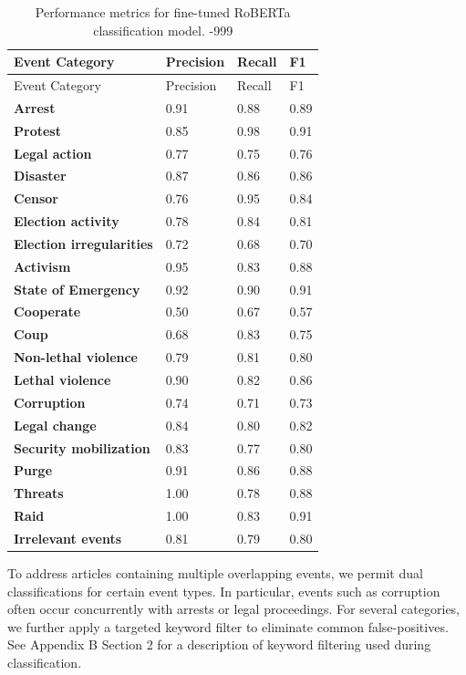 \documentclass[
  letterpaper,
  DIV=11,
  numbers=noendperiod]{scrartcl}
\begin{document}
\hypertarget{tbl-roberta}{}
\begin{longtable}[]{@{}llll@{}}
\caption{\label{tbl-roberta}Performance metrics for fine-tuned RoBERTa
classification model. -999}\tabularnewline
\toprule\noalign{}
Event Category & Precision & Recall & F1 \\
\midrule\noalign{}
\endfirsthead
\toprule\noalign{}
Event Category & Precision & Recall & F1 \\
\midrule\noalign{}
\endhead
\bottomrule\noalign{}
\endlastfoot
\textbf{Arrest} & 0.91 & 0.88 & 0.89 \\
\textbf{Protest} & 0.85 & 0.98 & 0.91 \\
\textbf{Legal action} & 0.77 & 0.75 & 0.76 \\
\textbf{Disaster} & 0.87 & 0.86 & 0.86 \\
\textbf{Censor} & 0.76 & 0.95 & 0.84 \\
\textbf{Election activity} & 0.78 & 0.84 & 0.81 \\
\textbf{Election irregularities} & 0.72 & 0.68 & 0.70 \\
\textbf{Activism} & 0.95 & 0.83 & 0.88 \\
\textbf{State of Emergency} & 0.92 & 0.90 & 0.91 \\
\textbf{Cooperate} & 0.50 & 0.67 & 0.57 \\
\textbf{Coup} & 0.68 & 0.83 & 0.75 \\
\textbf{Non-lethal violence} & 0.79 & 0.81 & 0.80 \\
\textbf{Lethal violence} & 0.90 & 0.82 & 0.86 \\
\textbf{Corruption} & 0.74 & 0.71 & 0.73 \\
\textbf{Legal change} & 0.84 & 0.80 & 0.82 \\
\textbf{Security mobilization} & 0.83 & 0.77 & 0.80 \\
\textbf{Purge} & 0.91 & 0.86 & 0.88 \\
\textbf{Threats} & 1.00 & 0.78 & 0.88 \\
\textbf{Raid} & 1.00 & 0.83 & 0.91 \\
\textbf{Irrelevant events} & 0.81 & 0.79 & 0.80 \\
\end{longtable}

To address articles containing multiple overlapping events, we permit
dual classifications for certain event types. In particular, events such
as corruption often occur concurrently with arrests or legal
proceedings. For several categories, we further apply a targeted keyword
filter to eliminate common false-positives. See Appendix B Section 2 for
a description of keyword filtering used during classification.
\end{document}
